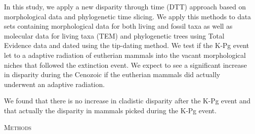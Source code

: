 \documentclass[12pt,letterpaper]{article}
\renewcommand{\section}[1]{%
\bigskip
\begin{center}
\begin{Large}
\normalfont\scshape #1
\medskip
\end{Large}
\end{center}}
\begin{document}
In this study, we apply a new disparity through time (DTT) approach based on morphological data and phylogenetic time slicing. We apply this methods to data sets containing morphological data for both living and fossil taxa as well as molecular data for living taxa (TEM) and phylogenetic trees using Total Evidence data and dated using the tip-dating method. 
We test if the K-Pg event let to a adaptive radiation of eutherian mammals into the vacant morphological niches that followed the extinction event. We expect to see a significant increase in disparity during the Cenozoic if the eutherian mammals did actually underwent an adaptive radiation.

We found that there is no increase in cladistic disparity after the K-Pg event and that actually the disparity in mammals picked during the K-Pg event.
%
%

\section{Methods}

\end{document}
